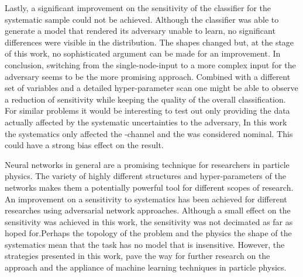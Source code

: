 Lastly, a significant improvement on the sensitivity of the classifier for the systematic sample could not be achieved. Although the classifier was able to generate a model that rendered its adversary unable to learn, no significant differences were visible in the distribution. The shapes changed but, at the stage of this work, no sophisticated argument can be made for an improvement. In conclusion, switching from the single-node-input to a more complex input for the adversary seems to be the more promising approach. Combined with a different set of variables and a detailed hyper-parameter scan one might be able to observe a reduction of sensitivity while keeping the quality of the overall classification.
For similar problems it would be interesting to test out only providing the data actually affected by the systematic uncertainties to the adversary, In this work the systematics only affected the \tW-channel and the \ttbar was considered nominal. This could have a strong bias effect on the result.

Neural networks in general are a promising technique for researchers in particle physics. The variety of highly different structures and hyper-parameters of the networks makes them a potentially powerful tool for different scopes of research. An improvement on a sensitivity to systematics has been achieved for different researches using adversarial network approaches. Although a small effect on the sensitivity was achieved in this work, the sensitivity was not decimated as far as hoped for.Perhaps the topology of the problem and the physics the shape of the systematics mean that the task has no model that is insensitive. However, the strategies presented in this work, pave the way for further research on the approach and the appliance of machine learning techniques in particle physics.

